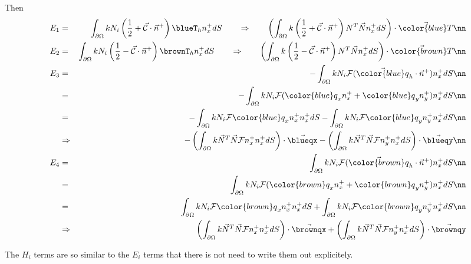 Then 
\begin{eqnarray}
E_1 &=&
\int_{\partial\Omega} k N_i \left( \frac{1}{2} + \vec{\cal C} \cdot \vec{n}^+ \right) \blueT_h  n^+_x dS 
\qquad \Rightarrow \qquad
\left(\int_{\partial\Omega} k \left( \frac{1}{2} + \vec{\cal C} \cdot \vec{n}^+ \right) {N}^T \vec{N} n^+_x dS \right)\cdot \vec{\color{blue}T} \nn\\
E_2 &=& 
\int_{\partial\Omega} k N_i \left( \frac{1}{2} - \vec{\cal C} \cdot \vec{n}^+ \right) \brownT_h   n^+_x dS
\qquad \Rightarrow \qquad
\left(\int_{\partial\Omega} k \left( \frac{1}{2} - \vec{\cal C} \cdot \vec{n}^+ \right) {N}^T \vec{N} n^+_x dS \right)\cdot \vec{\color{brown}T} \nn\\
E_3 
&=& -\int_{\partial\Omega} k N_i  {\cal F} (\vec{\color{blue}q}_h \cdot \vec{n}^+ )  n^+_x dS \nn\\ 
&=& -\int_{\partial\Omega} k N_i  {\cal F} ({\color{blue}q}_x {n}^+_x + {\color{blue}q}_y {n}^+_y )  n^+_x dS \nn\\ 
&=& -\int_{\partial\Omega} k N_i  {\cal F} {\color{blue}q}_x {n}^+_x   n^+_x dS 
   -\int_{\partial\Omega} k N_i  {\cal F} {\color{blue}q}_y {n}^+_y   n^+_x dS \nn\\
&\Rightarrow&  
 -\left(\int_{\partial\Omega} k \vec{N}^T\vec{N}  {\cal F} {n}^+_x   n^+_x dS \right)\cdot \vec{\blueqx} 
-\left(\int_{\partial\Omega} k \vec{N}^T\vec{N}  {\cal F} {n}^+_y   n^+_x dS \right)\cdot \vec{\blueqy} \nn\\
E_4 
&=& \int_{\partial\Omega} k N_i  {\cal F} (\vec{\color{brown}q}_h \cdot \vec{n}^+ )  n^+_x dS \nn\\
&=& \int_{\partial\Omega} k N_i  {\cal F} ({\color{brown}q}_x  {n}^+_x + {\color{brown}q}_y  {n}^+_y )  n^+_x dS \nn\\
&=& \int_{\partial\Omega} k N_i  {\cal F} {\color{brown}q}_x  {n}^+_x   n^+_x dS 
  + \int_{\partial\Omega} k N_i  {\cal F} {\color{brown}q}_y  {n}^+_y   n^+_x dS \nn\\
&\Rightarrow&  
 \left(\int_{\partial\Omega} k \vec{N}^T\vec{N}  {\cal F} {n}^+_x   n^+_x dS \right)\cdot \vec{\brownqx} 
+\left(\int_{\partial\Omega} k \vec{N}^T\vec{N}  {\cal F} {n}^+_y   n^+_x dS \right)\cdot \vec{\brownqy} 
\end{eqnarray}

The $H_i$ terms are so similar to the $E_i$ terms that there is not need to write them out explicitely.


